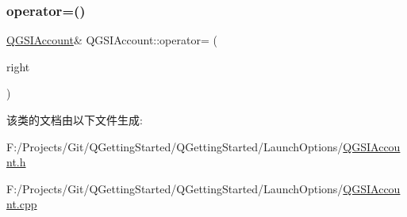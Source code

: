 \mbox{\label{class_q_g_s_i_account_a2e5c4ec77b5d33e7d7823f331b51e4bd}} 
\subsubsection{\texorpdfstring{operator=()}{operator=()}\hspace{0.1cm}{\footnotesize\ttfamily [2/2]}}
{\footnotesize\ttfamily \mbox{\hyperlink{class_q_g_s_i_account}{Q\+G\+S\+I\+Account}}\& Q\+G\+S\+I\+Account\+::operator= (\begin{DoxyParamCaption}\item[{\mbox{\hyperlink{class_q_g_s_i_account}{Q\+G\+S\+I\+Account}} \&\&}]{right }\end{DoxyParamCaption})\hspace{0.3cm}{\ttfamily [default]}}



该类的文档由以下文件生成\+:\begin{DoxyCompactItemize}
\item 
F\+:/\+Projects/\+Git/\+Q\+Getting\+Started/\+Q\+Getting\+Started/\+Launch\+Options/\mbox{\hyperlink{_q_g_s_i_account_8h}{Q\+G\+S\+I\+Account.\+h}}\item 
F\+:/\+Projects/\+Git/\+Q\+Getting\+Started/\+Q\+Getting\+Started/\+Launch\+Options/\mbox{\hyperlink{_q_g_s_i_account_8cpp}{Q\+G\+S\+I\+Account.\+cpp}}\end{DoxyCompactItemize}
